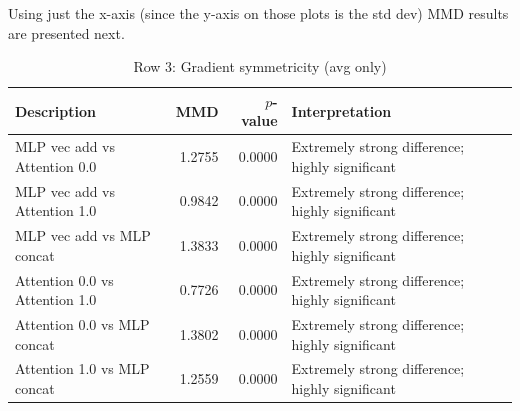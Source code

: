 \documentclass{article} %
\theoremstyle{plain}
\theoremstyle{definition}
\newtheorem{empirical fact}[theorem]{Empirical Fact}
\begin{document}
Using just the x-axis (since the y-axis on those plots is the std dev) MMD results are presented next.

\begin{table}[t][h]
\centering
\caption{Permutation-test MMDs on scatter-plot  averages only (1-D).  
All $p$–values are $\le 10^{-6}$, so every difference is ``highly significant.'' Note that the distance between attention 0.0, attention 1.0, and MLP vec add is large, implying they are not performing vector addition.}
\label{tab:grad-dirrel-mmd}

\begin{subtable}[t]{\textwidth}
\centering
\caption{Row 3: Gradient symmetricity (avg only)}
\begin{tabular}{lrrl}
\toprule
Description & MMD & $p$-value & Interpretation \\
\midrule
MLP vec add vs Attention 0.0   & 1.2755 & 0.0000 & Extremely strong difference; highly significant \\
MLP vec add vs Attention 1.0   & 0.9842 & 0.0000 & Extremely strong difference; highly significant \\
MLP vec add vs MLP concat      & 1.3833 & 0.0000 & Extremely strong difference; highly significant \\
Attention 0.0 vs Attention 1.0 & 0.7726 & 0.0000 & Extremely strong difference; highly significant \\
Attention 0.0 vs MLP concat    & 1.3802 & 0.0000 & Extremely strong difference; highly significant \\
Attention 1.0 vs MLP concat    & 1.2559 & 0.0000 & Extremely strong difference; highly significant \\
\bottomrule
\end{tabular}
\end{subtable}

\vspace{0.75em}


\end{table}
\end{document}
